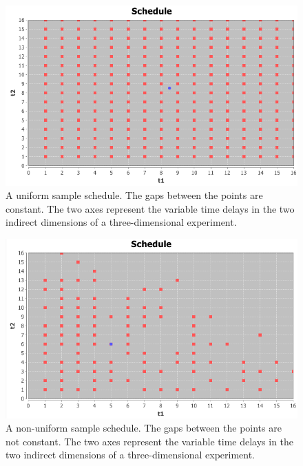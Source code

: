 \begin{figure}
  \includegraphics[scale=0.5]{figures/schedule_uniform}
  \caption[A uniform sample schedule.]
          {A uniform sample schedule.  The gaps between the points
           are constant.  The two axes represent the 
           variable time delays in the two indirect dimensions of a
           three-dimensional experiment.}
  \label{schedule_uniform}
\end{figure}

\begin{figure}
  \includegraphics[scale=0.5]{figures/schedule_nonuniform}
  \caption[A non-uniform sample schedule.]
          {A non-uniform sample schedule.  The gaps between the points
           are not constant.  The two axes represent the 
           variable time delays in the two indirect dimensions of a
           three-dimensional experiment.}
  \label{schedule_nonuniform}
\end{figure}

